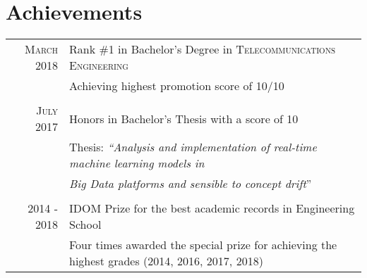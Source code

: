 \documentclass[a4paper,10pt]{article}
\begin{document}
\section{Achievements}
\begin{tabular}{rp{13.6cm}}
\textsc{March} 2018 & Rank \#1 in Bachelor's Degree in \textsc{Telecommunications Engineering} \\%
&\footnotesize{Achieving highest promotion score of 10/10} \\&\\

\textsc{July} 2017 & Honors in Bachelor's Thesis with a score of 10 \\%
& \footnotesize{Thesis: \emph{``Analysis and implementation of real-time machine learning models in}} \\
& \footnotesize{ \hspace{10mm}\emph{ Big Data platforms and sensible to concept drift}'' }\\&\\

2014 - 2018 & IDOM Prize for the best academic records in Engineering School\\%
&\footnotesize{ Four times awarded the special prize for achieving the highest grades (2014, 2016, 2017, 2018)} \\
\end{tabular}


\end{document}
